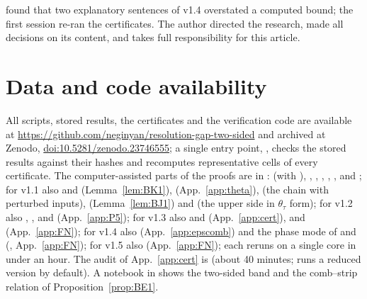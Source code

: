 \begin{acknowledgments}
found that two explanatory sentences of v1.4 overstated a computed bound; the first session re-ran the certificates. The author directed the research, made all decisions on its content, and takes full responsibility for this article.
\end{acknowledgments}

\section*{Data and code availability}
All scripts, stored results, the certificates and the verification code are available at
\url{https://github.com/neginyan/resolution-gap-two-sided} and archived at Zenodo, \href{https://doi.org/10.5281/zenodo.23746555}{doi:10.5281/zenodo.23746555}; a single entry point, , checks the stored results
against their hashes and recomputes representative cells of every certificate. The computer-assisted parts of the proofs are in
:  (with ), , , ,
, ,  and ; for v1.1 also  and
 (Lemma~\ref{lem:BK1}),  (App.~\ref{app:theta}),  (the chain with perturbed inputs),
 (Lemma~\ref{lem:BJ1}) and  (the upper side in $\theta_\tau$ form); for v1.2 also ,
,  and  (App.~\ref{app:P5}); for v1.3 also  and  (App.~\ref{app:cert}),  and  (App.~\ref{app:FN}); for v1.4 also  (App.~\ref{app:epscomb}) and the phase mode of
 and  (, App.~\ref{app:FN}); for v1.5 also  (App.~\ref{app:FN}); each reruns on a single core in under an hour. The audit of
App.~\ref{app:cert} is  (about 40 minutes;  runs a reduced version by default).
A notebook in  shows the two-sided band and the comb--strip relation of Proposition~\ref{prop:BE1}.
